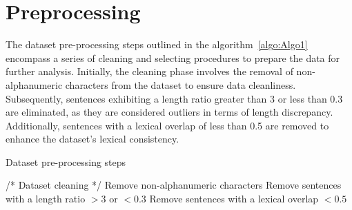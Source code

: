 \section{Preprocessing}
The dataset pre-processing steps outlined in the algorithm~\ref{algo:Algo1} encompass a series of cleaning and selecting procedures to prepare the data for further analysis. 
Initially, the cleaning phase involves the removal of non-alphanumeric characters from the dataset to ensure data cleanliness. 
Subsequently, sentences exhibiting a length ratio greater than 3 or less than 0.3 are eliminated, as they are considered outliers in terms of length discrepancy. 
Additionally, sentences with a lexical overlap of less than 0.5 are removed to enhance the dataset's lexical consistency. 

\begin{algorithm}
	\begin{algorithmic}[1]
		\caption{Dataset pre-processing steps}
	\label{algo:Algo1}
		\State /* Dataset cleaning */
		\State Remove non-alphanumeric characters 
		\State Remove sentences with a length ratio $> 3$ or $< 0.3$
		\State Remove sentences with a lexical overlap $< 0.5$
	\end{algorithmic}
\end{algorithm}
	

